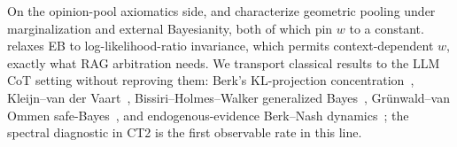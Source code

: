 On the opinion-pool axiomatics side, \citet{mcconway1981marginalization} and \citet{genest1986characterization} characterize geometric pooling under marginalization and external Bayesianity, both of which pin $w$ to a constant.  relaxes EB to log-likelihood-ratio invariance, which permits context-dependent $w$, exactly what RAG arbitration needs. We transport classical results to the LLM CoT setting without reproving them: Berk's KL-projection concentration~\citep{berk1966}, Kleijn--van der Vaart~\citep{kleijn2006}, Bissiri--Holmes--Walker generalized Bayes~\citep{bissiri2016}, Gr\"unwald--van Ommen safe-Bayes~\citep{grunwald2017}, and endogenous-evidence Berk--Nash dynamics~\citep{esponda2016,fudenberg2021}; the spectral diagnostic in CT2 is the first observable rate in this line.
